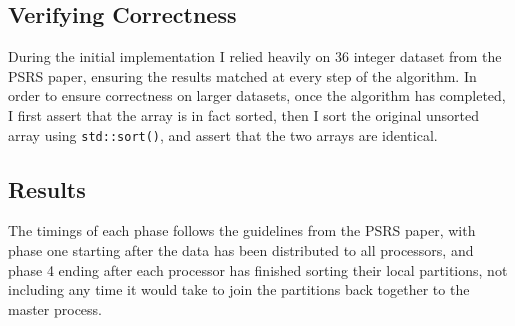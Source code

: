 \documentclass[11pt]{report}
\begin{document}
\subsection*{Verifying Correctness}
During the initial implementation I relied heavily on 36 integer dataset from the 
PSRS paper, ensuring the results matched at every step of the algorithm. In order to ensure correctness on larger datasets, once the algorithm has completed, I first assert that the array is in fact sorted, then I sort the original unsorted array using \verb|std::sort()|, and assert that the two arrays are identical.
\subsection*{Results}
The timings of each phase follows the guidelines from the PSRS paper, with phase one starting after the data has been distributed to all processors, and phase 4 ending
after each processor has finished sorting their local partitions, not including any time it would take to join the partitions back together to the master process.\\
\end{document}

